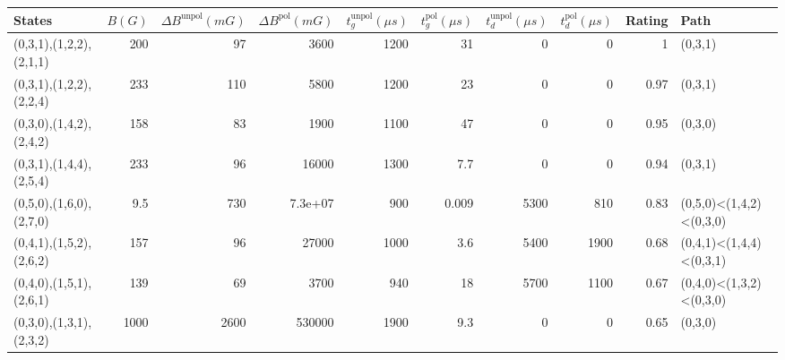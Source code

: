 \begin{tabular}{lrrrrrrrrl}
\hline
 {States}                &   {$B(G)$} &   {$\Delta B^{\text{unpol}}(mG)$} &   {$\Delta B^{\text{pol}}(mG)$} &   {$t^{\text{unpol}}_{g}(\mu s)$} &   {$t^{\text{pol}}_{g}(\mu s)$} &   {$t^{\text{unpol}}_{d}(\mu s)$} &   {$t^{\text{pol}}_{d}(\mu s)$} &   {Rating} & {Path}                  \\
\hline
 (0,3,1),(1,2,2),(2,1,1) &      200   &                                97 &                      3600       &                              1200 &                          31     &                                 0 &                               0 &       1    & (0,3,1)                 \\
 (0,3,1),(1,2,2),(2,2,4) &      233   &                               110 &                      5800       &                              1200 &                          23     &                                 0 &                               0 &       0.97 & (0,3,1)                 \\
 (0,3,0),(1,4,2),(2,4,2) &      158   &                                83 &                      1900       &                              1100 &                          47     &                                 0 &                               0 &       0.95 & (0,3,0)                 \\
 (0,3,1),(1,4,4),(2,5,4) &      233   &                                96 &                     16000       &                              1300 &                           7.7   &                                 0 &                               0 &       0.94 & (0,3,1)                 \\
 (0,5,0),(1,6,0),(2,7,0) &        9.5 &                               730 &                         7.3e+07 &                               900 &                           0.009 &                              5300 &                             810 &       0.83 & (0,5,0)<(1,4,2)<(0,3,0) \\
 (0,4,1),(1,5,2),(2,6,2) &      157   &                                96 &                     27000       &                              1000 &                           3.6   &                              5400 &                            1900 &       0.68 & (0,4,1)<(1,4,4)<(0,3,1) \\
 (0,4,0),(1,5,1),(2,6,1) &      139   &                                69 &                      3700       &                               940 &                          18     &                              5700 &                            1100 &       0.67 & (0,4,0)<(1,3,2)<(0,3,0) \\
 (0,3,0),(1,3,1),(2,3,2) &     1000   &                              2600 &                    530000       &                              1900 &                           9.3   &                                 0 &                               0 &       0.65 & (0,3,0)                 \\
\hline
\end{tabular}